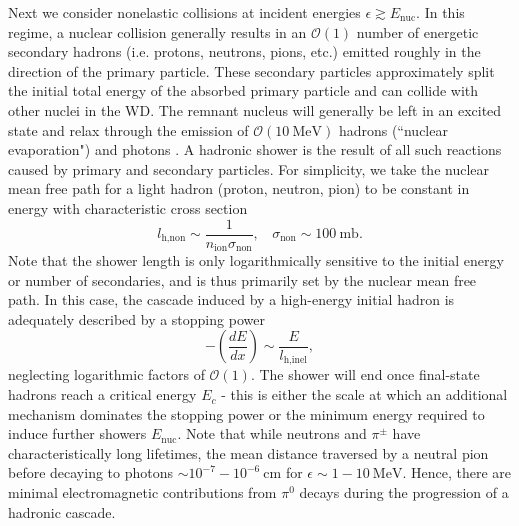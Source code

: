 \documentclass[twocolumn,showpacs,preprintnumbers,amsmath,amssymb,prd]{revtex4}
\newcommand{\OO}{\mathcal{O}}
\def\r{\right)}
\def\l{\left(}
\begin{document}
\begin{appendices}
Next we consider nonelastic collisions at incident energies $\epsilon \gtrsim E_\text{nuc}$.
In this regime, a nuclear collision generally results in an $\OO(1)$ number of energetic secondary hadrons (i.e.
protons, neutrons, pions, etc.) emitted roughly in the direction of the primary particle.
These secondary particles approximately split the initial total energy of the absorbed primary particle and can collide with other nuclei in the WD.
The remnant nucleus will generally be left in an excited state and relax through the emission of $\OO(10 ~\text{MeV})$ hadrons (``nuclear evaporation") and photons \cite{Rossi}.
A hadronic shower is the result of all such reactions caused by primary and secondary particles.
For simplicity, we take the nuclear mean free path for a light hadron (proton, neutron, pion) to be constant in energy with characteristic cross section
\begin{equation}
l_\text{h,non} \sim  \frac{1}{n_\text{ion} \sigma_\text{non}}, ~~~~ \sigma_\text{non} \sim 100 ~\text{mb}.
\end{equation}
Note that the shower length is only logarithmically sensitive to the initial energy or number of secondaries, and is thus primarily set by the nuclear mean free path.
In this case, the cascade induced by a high-energy initial hadron is adequately described by a stopping power
\begin{equation}
\label{eq:nucshower}
-\l \frac{dE}{dx}\r \sim \frac{E}{l_\text{h,inel}},
\end{equation}
neglecting logarithmic factors of $\OO(1)$.
The shower will end once final-state hadrons reach a critical energy $E_c$ - this is either the scale at which an additional mechanism dominates the stopping power or the minimum energy required to induce further showers $E_\text{nuc}$.
Note that while neutrons and $\pi^\pm$ have characteristically long lifetimes, the mean distance traversed by a neutral pion before decaying to photons $\sim 10^{-7} - 10^{-6} ~\text{cm}$ for $\epsilon \sim 1 - 10 ~\text{MeV}$.
Hence, there are minimal electromagnetic contributions from $\pi^0$ decays during the progression of a hadronic cascade.


\end{appendices}
\end{document}
